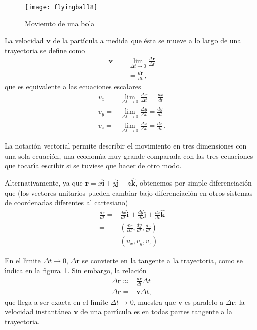 \begin{figure}
  \centering
  \texttt{[image: flyingball8]}
  \caption{Moviemto de una bola}
  \label{fig:flyingball8}
\end{figure}


La velocidad $\mathbf{v}$ de la partícula a medida que ésta se mueve a lo largo de una trayectoria se define como
\begin{align}
  \mathbf{v}=&\lim_{\Delta t\to0}\frac{\Delta\mathbf{r}}{\Delta t}\nonumber\\
  &=\frac{d\mathbf{r}}{dt}\,,
\end{align}
que es equivalente a las ecuaciones escalares
\begin{align}
  v_x=&\lim_{\Delta t\to0}\frac{\Delta x}{\Delta t}=\frac{dx}{dt}\nonumber\\
  v_y=&\lim_{\Delta t\to0}\frac{\Delta y}{\Delta t}=\frac{dy}{dt}\nonumber\\
  v_z=&\lim_{\Delta t\to0}\frac{\Delta z}{\Delta t}=\frac{dz}{dt}\,.
\end{align}

La notaci\'on vectorial permite describir el movimiento en tres dimensiones con una sola ecuaci\'on, una econom\'\i a muy grande comparada con las tres ecuaciones que tocar\'\i a escribir si se tuviese que hacer de otro modo. 

Alternativamente, ya que $\mathbf{r}=x\hat{\mathbf{i}}+
y\hat{\mathbf{j}}+z\hat{\mathbf{k}}$, obtenemos por simple
diferenciaci\'on que (los vectores unitarios pueden cambiar bajo
diferenciaci\'on en otros sistemas de coordenadas diferentes al
cartesiano)
\begin{align}
 \frac{d\mathbf{r}}{dt}=&\frac{dx}{dt}\hat{\mathbf{i}}   
+\frac{dy}{dt}\hat{\mathbf{j}}   +\frac{dz}{dt}\hat{\mathbf{k}}\nonumber\\
=&
\left(
\frac{dx}{dt},\frac{dy}{dt},\frac{dz}{dt}
\right)\nonumber\\
=&(v_x,v_y,v_z)
\end{align}




En el l\'\i mite $\Delta t\to0$, $\Delta\mathbf{r}$ se convierte en la tangente a la trayectoria, como se \'\i ndica en la figura~\ref{fig:flyingball8}. Sin embargo, la relaci\'on
\begin{align}
  \label{eq:Drvt}
  \Delta\mathbf{r}\approx&\frac{d\mathbf{r}}{dt}\Delta t\nonumber\\
  \Delta\mathbf{r}=&\mathbf{v}\Delta t,
\end{align}
que llega a ser exacta en el l\'\i mite $\Delta t\to 0$, muestra que $\mathbf{v}$ es paralelo a $\Delta\mathbf{r}$; la velocidad instant\'anea $\mathbf{v}$ de una part\'\i cula es en todas partes tangente a la trayectoria. 

